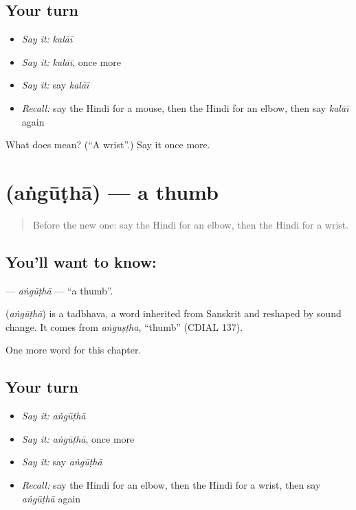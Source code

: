 \subsection*{Your turn}
\begin{itemize}
\raggedright
  \item \emph{Say it:} \emph{kalāī}
  \item \emph{Say it:} \emph{kalāī}, once more
  \item \emph{Say it:} say \emph{kalāī}
  \item \emph{Recall:} say the Hindi for a mouse, then the Hindi for an elbow, then say \emph{kalāī} again
\end{itemize}

\begin{tcolorbox}[breakable,colback=teal!4,colframe=teal!35!black,title={Before you move on}]
What does  mean? (\textquotedblleft{}A wrist\textquotedblright{}.) Say it once more.
\end{tcolorbox}
\section[\texorpdfstring{\hi{अंगूठा} (aṅgūṭhā)}{अंगूठा (aṅgūṭhā)}]{ (aṅgūṭhā) — a thumb}

\label{lesson:HI-C150-angutha}



\begin{quote}
Before the new one: say the Hindi for an elbow, then the Hindi for a wrist.
\end{quote}

\subsection*{You'll want to know: }
\textbf{} — \emph{aṅgūṭhā} — \textquotedblleft{}a thumb\textquotedblright{}.

\begin{cousinweb}
\textbf{} (\emph{aṅgūṭhā}) is a tadbhava, a word inherited from Sanskrit and reshaped by sound change. It comes from \emph{aṅguṣṭha}, \textquotedblleft{}thumb\textquotedblright{} (CDIAL 137).
\end{cousinweb}

\begin{grammarlens}[title={What you've built}]
One more word for this chapter.
\end{grammarlens}

\subsection*{Your turn}
\begin{itemize}
\raggedright
  \item \emph{Say it:} \emph{aṅgūṭhā}
  \item \emph{Say it:} \emph{aṅgūṭhā}, once more
  \item \emph{Say it:} say \emph{aṅgūṭhā}
  \item \emph{Recall:} say the Hindi for an elbow, then the Hindi for a wrist, then say \emph{aṅgūṭhā} again
\end{itemize}

